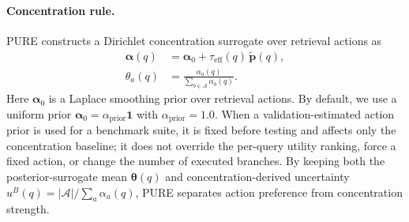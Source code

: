 \documentclass[a4paper,fleqn]{cas-dc}
\begin{document}
\paragraph{Concentration rule.}

PURE constructs a Dirichlet concentration surrogate over retrieval actions as
\begin{equation}
\label{eq:dirichlet_concentration_alpha}
\begin{aligned}
\boldsymbol{\alpha}(q)
&= \boldsymbol{\alpha}_0
+ \tau_{\mathrm{eff}}(q)\,\tilde{\mathbf{p}}(q),\\[4pt]
\theta_a(q)
&= \frac{\alpha_a(q)}
{\sum_{b\in\mathcal{A}}\alpha_b(q)}.
\end{aligned}
\end{equation}
Here $\boldsymbol{\alpha}_0$ is a Laplace smoothing prior over retrieval actions. By default, we use a uniform prior $\boldsymbol{\alpha}_0=\alpha_{\mathrm{prior}}\mathbf{1}$ with $\alpha_{\mathrm{prior}}=1.0$. When a validation-estimated action prior is used for a benchmark suite, it is fixed before testing and affects only the concentration baseline; it does not override the per-query utility ranking, force a fixed action, or change the number of executed branches. By keeping both the posterior-surrogate mean $\boldsymbol{\theta}(q)$ and concentration-derived uncertainty $u^B(q)=|\mathcal{A}|/\sum_a\alpha_a(q)$, PURE separates action preference from concentration strength.
\end{document}
